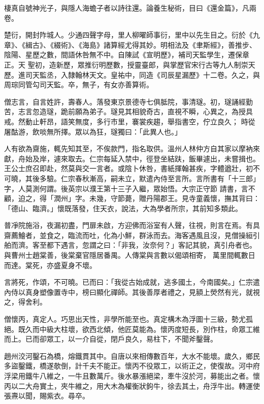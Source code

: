 \begin{pinyinscope}
 棲真自號神光子，與隱人海蟾子者以詩往還。論養生秘術，目曰《還金篇》，凡兩卷。



 楚衍，開封阼城人。少通四聲字母，里人柳曜師事衍，里中以先生目之。衍於《九章》、《緝古》、《綴術》、《海島》諸算經尤得其妙。明相法及《聿斯經》，善推步、陰陽、星歷之數，間語休咎無不中。自陳試《宣明歷》，補司天監學生，遷保章正。天
 聖初，造新歷，眾推衍明歷數，授靈臺郎，與掌歷官宋行古等九人制崇天歷。進司天監丞，入隸翰林天文。皇祐中，同造《司辰星漏歷》十二卷。久之，與周琮同管勾司天監。卒，無子，有女亦善算術。



 僧志言，自言姓許，壽春人。落發東京景德寺七俱胝院，事清璲。初，璲誦經勤苦，志言忽造璲，跪前願為弟子。璲見其相貌奇古，直視不瞬，心異之，為授具戒。然動止軒昂，語笑無度，多行市里，褰裳疾趨，舉指書空，佇立良久；
 時從屠酤游，飲啖無所擇。眾以為狂，璲獨曰：「此異人也。」



 人有欲為齋施，輒先知其至，不俟款門，指名取供。溫州人林仲方自其家以摩衲來獻，舟始及岸，遽來取去。仁宗每延入禁中，徑登坐結趺，飯畢遽出，未嘗揖也。王公士庶召即赴，然莫與交一言者。或陰卜休咎，書紙揮翰甚疾，字體遒壯，初不可曉，其後多驗。仁宗春秋漸高，嗣未立，默遣內侍至言所。言所書有「十三郎」字，人莫測何謂。後英宗以濮王第十三子入繼，眾始悟。大宗正守節
 請書，言不顧，迫之，得「潤州」字。未幾，守節薨，贈丹陽郡王。見寺童義懷，撫其背曰：「德山、臨濟。」懷既落發，住天衣，說法，大為學者所宗，其前知多類此。



 普凈院施浴，夜漏初盡，門扉未啟，方迎佛而浴室有人聲，往視，則言在焉。有具齋薦鱠者，並食之，臨流而吐，化為小鮮，群泳而去。海客遇風且沒，見僧操絙引舶而濟。客至都下遇言，忽謂之曰：「非我，汝奈何？」客記其貌，真引舟者也。與曹州士趙棠善，後棠棄官隱居番禺。人傳棠與言數以偈頌相寄，
 萬里間輒數日而達。棠死，亦盛夏身不壞。



 言將死，作頌，不可曉。已而曰：「我從古始成就，逃多國土，今南國矣。」仁宗遣內侍以真身塑像置寺中，榜曰顯化禪師。其後善厚者禮之，見額上熒然有光，就視之，得舍利。



 僧懷丙，真定人。巧思出天性，非學所能至也。真定構木為浮圖十三級，勢尤孤絕。既久而中級大柱壞，欲西北傾，他匠莫能為。懷丙度短長，別作柱，命眾工維而上。已而卻眾工，以一介自從，閉戶良久，易柱下，不聞斧鑿聲。



 趙州洨河鑿石為橋，熔鐵貫其中。自唐以來相傳數百年，大水不能壞。歲久，鄉民多盜鑿鐵，橋遂欹倒，計千夫不能正。懷丙不役眾工，以術正之，使復故。河中府浮梁用鐵牛八維之，一牛且數萬斤。後水暴漲絕梁，牽牛沒於河，募能出之者。懷丙以二大舟實土，夾牛維之，用大木為權衡狀鉤牛，徐去其土，舟浮牛出。轉運使張燾以聞，賜紫衣。尋卒。




\end{pinyinscope}
